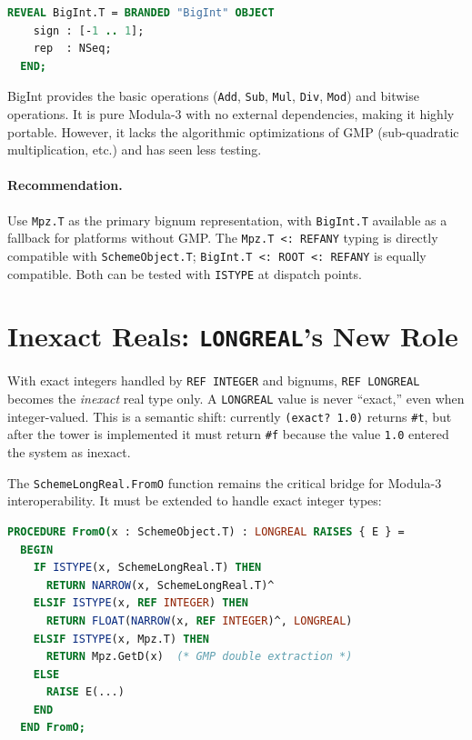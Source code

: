 \documentclass[12pt]{report}
\begin{document}
\begin{lstlisting}[language=Modula3]
REVEAL BigInt.T = BRANDED "BigInt" OBJECT
    sign : [-1 .. 1];
    rep  : NSeq;
  END;
\end{lstlisting}

\noindent BigInt provides the basic operations ({\tt Add}, {\tt Sub},
{\tt Mul}, {\tt Div}, {\tt Mod}) and bitwise operations.  It is pure
Modula-3 with no external dependencies, making it highly portable.
However, it lacks the algorithmic optimizations of GMP (sub-quadratic
multiplication, etc.) and has seen less testing.

\paragraph{Recommendation.}
Use {\tt Mpz.T} as the primary bignum representation, with {\tt BigInt.T}
available as a fallback for platforms without GMP.  The {\tt Mpz.T
<: REFANY} typing is directly compatible with {\tt SchemeObject.T};
{\tt BigInt.T <: ROOT <: REFANY} is equally compatible.  Both can be
tested with {\tt ISTYPE} at dispatch points.

\section{Inexact Reals: {\tt LONGREAL}'s New Role}

With exact integers handled by {\tt REF INTEGER} and bignums,
{\tt REF LONGREAL} becomes the \emph{inexact} real type only.
A {\tt LONGREAL} value is never ``exact,'' even when integer-valued.
This is a semantic shift: currently {\tt (exact?\ 1.0)} returns
{\tt \#t}, but after the tower is implemented it must return {\tt \#f}
because the value {\tt 1.0} entered the system as inexact.

The {\tt SchemeLongReal.FromO} function remains the critical bridge
for Modula-3 interoperability.  It must be extended to handle exact
integer types:

\begin{lstlisting}[language=Modula3]
PROCEDURE FromO(x : SchemeObject.T) : LONGREAL RAISES { E } =
  BEGIN
    IF ISTYPE(x, SchemeLongReal.T) THEN
      RETURN NARROW(x, SchemeLongReal.T)^
    ELSIF ISTYPE(x, REF INTEGER) THEN
      RETURN FLOAT(NARROW(x, REF INTEGER)^, LONGREAL)
    ELSIF ISTYPE(x, Mpz.T) THEN
      RETURN Mpz.GetD(x)  (* GMP double extraction *)
    ELSE
      RAISE E(...)
    END
  END FromO;
\end{lstlisting}
\end{document}
